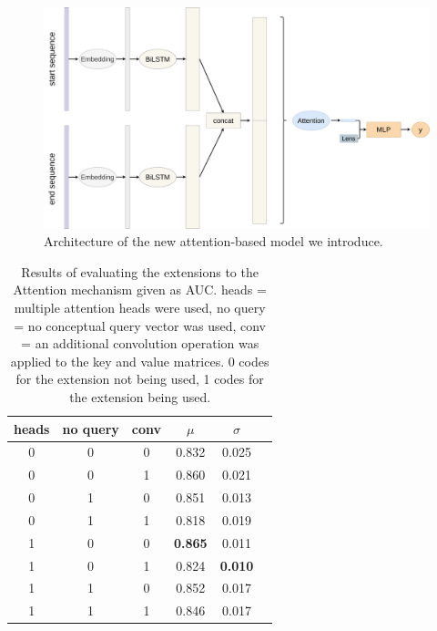 \begin{figure}
	\centering\includegraphics[width=1\textwidth]{../visualizations/ch4-methods/visualizations-AttnBiLSTM.pdf} 
	\caption{Architecture of the new attention-based model we introduce. }
	\label{fig:attnbilstm}
\end{figure}


\begin{table}[h!]
	\centering
	\begin{tabular}{| c c c | c c | c} 
		\hline
		heads & no query & conv & $\mu$ & $\sigma$ \\
		\hline
		0 & 0 & 0 & 0.832 & 0.025 \\
		0 & 0 & 1 & 0.860 & 0.021 \\
		0 & 1 & 0 & 0.851 & 0.013 \\
		0 & 1 & 1 & 0.818 & 0.019 \\
		1 & 0 & 0 & \textbf{0.865} & 0.011 \\
		1 & 0 & 1 & 0.824 & \textbf{0.010} \\
		1 & 1 & 0 & 0.852 & 0.017 \\
		1 & 1 & 1 & 0.846 & 0.017 \\
		\hline
	\end{tabular}
	\caption{Results of evaluating the extensions to the Attention mechanism given as AUC. heads = multiple attention heads were used, no query = no conceptual query vector was used, conv = an additional convolution operation was applied to the key and value matrices. 0 codes for the extension not being used, 1 codes for the extension being used.
	}
	\label{table:attn_gridsearch}
\end{table}

